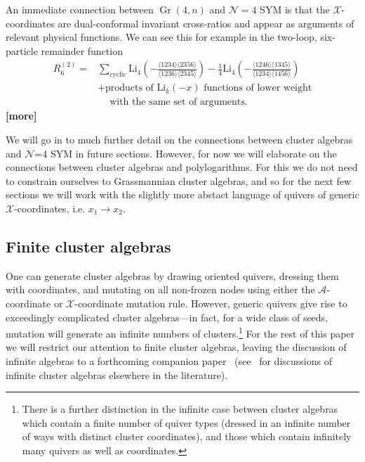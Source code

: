 \documentclass[11pt]{article}
\DeclareMathOperator{\Gr}{Gr}
\def\nl{\nonumber\\}
\def\nn{\nonumber}
\def\x{\mathcal{X}}
\def\xcoords{$\mathcal{X}$-coordinates}
\def\a{\mathcal{A}}
\def\draftnote#1{{\bf [#1]}}
\begin{document}
\newpage

An immediate connection between $\Gr(4,n)$ and $\mathcal{N}=4$ SYM is that the $\x$-coordinates are dual-conformal invariant cross-ratios and appear as arguments of relevant physical functions. We can see this for example in the two-loop, six-particle remainder function 
\begin{align}
	R^{(2)}_6 = &\sum_{\text{cyclic}} \text{Li}_4\left(-\frac{\langle 1234 \rangle \langle 2356 \rangle}{\langle 1236 \rangle \langle 2345 \rangle}\right) - \frac{1}{4} \text{Li}_4 \left(-\frac{\langle 1246 \rangle \langle 1345 \rangle}{\langle 1234 \rangle \langle 1456 \rangle}\right)\nl
	&+\text{products of } \text{Li}_{k}(-x) \text{ functions of lower weight}\\ &\quad~\text{with the same set of arguments.}\nn
\end{align}
\draftnote{more}

We will go in to much further detail on the connections between cluster algebras and $\mathcal{N}$=4 SYM in future sections. However, for now we will elaborate on the connections between cluster algebras and polylogarithms. For this we do not need to constrain ourselves to Grassmannian cluster algebras, and so for the next few sections we will work with the slightly more abstact language of quivers of generic \xcoords, i.e. $x_1 \to x_2$. 

\newpage
\subsection{Finite cluster algebras}\label{sec:finite-algebras}

One can generate cluster algebras by drawing oriented quivers, dressing them with coordinates, and mutating on all non-frozen nodes using either the $\a$-coordinate or $\x$-coordinate mutation rule. However, generic quivers give rise to exceedingly complicated cluster algebras---in fact, for a wide class of seeds, mutation will generate an infinite numbers of clusters.\footnote{There is a further distinction in the infinite case between cluster algebras which contain a finite number of quiver types (dressed in an infinite number of ways with distinct cluster coordinates), and those which contain infinitely many quivers as well as coordinates.} For the rest of this paper we will restrict our attention to finite cluster algebras, leaving the discussion of infinite algebras to a forthcoming companion paper~\cite{} (see~\cite{} for discussions of infinite cluster algebras elsewhere in the literature). 
\end{document}
